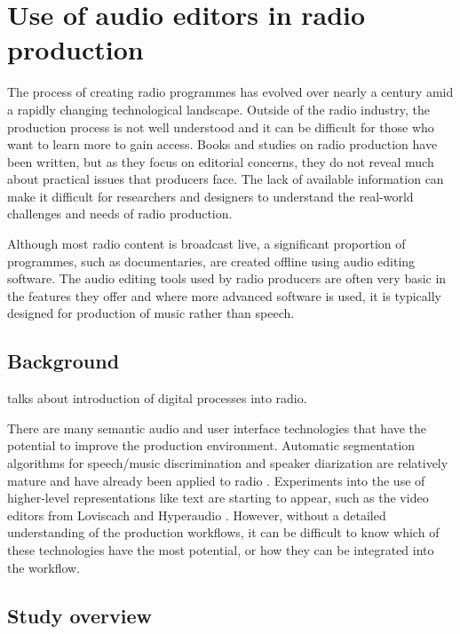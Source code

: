 \chapter{Use of audio editors in radio production}\label{chp:ethno}

The process of creating radio programmes has evolved over nearly a century amid a rapidly changing technological
landscape. Outside of the radio industry, the production process is not well understood and it can be difficult for
those who want to learn more to gain access. Books \citep{Hausman2012} and studies \citep{Dunaway2000} on radio
production have been written, but as they focus on editorial concerns, they do not reveal much about practical issues
that producers face.  The lack of available information can make it difficult for researchers and designers to
understand the real-world challenges and needs of radio production.

Although most radio content is broadcast live, a significant proportion of programmes, such as documentaries, are
created offline using audio editing software. The audio editing tools used by radio producers are often very basic in
the features they offer and where more advanced software is used, it is typically designed for production of music
rather than speech.

\section{Background}

\citet{Dunaway2000} talks about introduction of digital processes into radio.

There are many semantic audio and user interface technologies that have the potential to improve the production
environment. Automatic segmentation algorithms for speech/music discrimination \citep{Wieser2014} and speaker
diarization \citep{AngueraMiro2012} are relatively mature and have already been applied to radio \citep{Raimond2014}.
Experiments into the use of higher-level representations like text are starting to appear, such as the video editors
from Loviscach \citep{Loviscach2011a} and Hyperaudio \citep{Boas2011}.  However, without a detailed understanding of
the production workflows, it can be difficult to know which of these technologies have the most potential, or how they
can be integrated into the workflow.

\section{Study overview}

